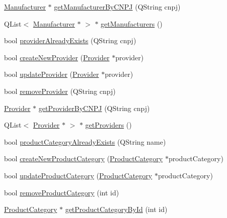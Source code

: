 \begin{DoxyCompactItemize}
\item 
\hyperlink{class_manufacturer}{\-Manufacturer} $\ast$ \hyperlink{class_database_controller_a42b7c72500ee24b9bb5c020356086b67}{get\-Manufacturer\-By\-C\-N\-P\-J} (\-Q\-String cnpj)
\item 
\-Q\-List$<$ \hyperlink{class_manufacturer}{\-Manufacturer} $\ast$ $>$ $\ast$ \hyperlink{class_database_controller_aa4d744bc3659c202686b9cdf4f32a3f4}{get\-Manufacturers} ()
\item 
bool \hyperlink{class_database_controller_a46dea4903e25bcfba747d183abecd389}{provider\-Already\-Exists} (\-Q\-String cnpj)
\item 
bool \hyperlink{class_database_controller_a5d1aee33390137b1f57b25f9eb9525b4}{create\-New\-Provider} (\hyperlink{class_provider}{\-Provider} $\ast$provider)
\item 
bool \hyperlink{class_database_controller_aace732ea7a728ecc2b3e56309f25901a}{update\-Provider} (\hyperlink{class_provider}{\-Provider} $\ast$provider)
\item 
bool \hyperlink{class_database_controller_ac892c8792946daeeac29f8d09ce9b658}{remove\-Provider} (\-Q\-String cnpj)
\item 
\hyperlink{class_provider}{\-Provider} $\ast$ \hyperlink{class_database_controller_a68c9a76f752cedf10eab274dba20cce3}{get\-Provider\-By\-C\-N\-P\-J} (\-Q\-String cnpj)
\item 
\-Q\-List$<$ \hyperlink{class_provider}{\-Provider} $\ast$ $>$ $\ast$ \hyperlink{class_database_controller_ab1f229dea327d0bf95b8dbe0992c77b3}{get\-Providers} ()
\item 
bool \hyperlink{class_database_controller_af8818a55383bc6b4927c20088768ca09}{product\-Category\-Already\-Exists} (\-Q\-String name)
\item 
bool \hyperlink{class_database_controller_a02861c615a9e9f9d40986ee04703e2d9}{create\-New\-Product\-Category} (\hyperlink{class_product_category}{\-Product\-Category} $\ast$product\-Category)
\item 
bool \hyperlink{class_database_controller_a61bd3bc281f2f8c60ed6ace228f1d9d3}{update\-Product\-Category} (\hyperlink{class_product_category}{\-Product\-Category} $\ast$product\-Category)
\item 
bool \hyperlink{class_database_controller_a1ffc18354fd3435e67cedf1e38c6c010}{remove\-Product\-Category} (int id)
\item 
\hyperlink{class_product_category}{\-Product\-Category} $\ast$ \hyperlink{class_database_controller_a3a35e6d723b3e47fb6e6a12bb0408c4b}{get\-Product\-Category\-By\-Id} (int id)

\end{DoxyCompactItemize}
